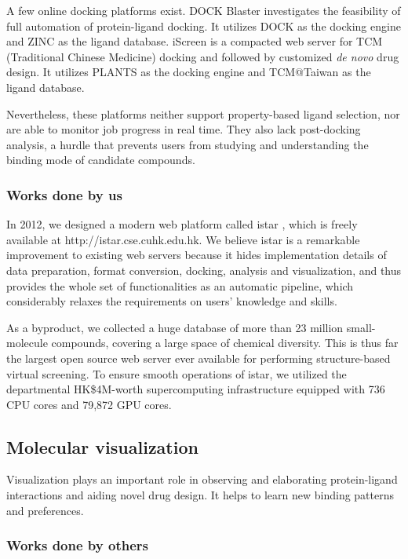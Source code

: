 \documentclass[a4paper,12pt]{article}
\begin{document}
A few online docking platforms exist. DOCK Blaster \citep{557} investigates the feasibility of full automation of protein-ligand docking. It utilizes DOCK \citep{1222} as the docking engine and ZINC \citep{532,1178} as the ligand database. iScreen \citep{899} is a compacted web server for TCM (Traditional Chinese Medicine) docking and followed by customized \textit{de novo} drug design. It utilizes PLANTS \citep{610,607,779} as the docking engine and TCM@Taiwan \citep{528} as the ligand database.

Nevertheless, these platforms neither support property-based ligand selection, nor are able to monitor job progress in real time. They also lack post-docking analysis, a hurdle that prevents users from studying and understanding the binding mode of candidate compounds.

\subsubsection*{Works done by us}

In 2012, we designed a modern web platform called istar \citep{1362}, which is freely available at http://istar.cse.cuhk.edu.hk. We believe istar is a remarkable improvement to existing web servers because it hides implementation details of data preparation, format conversion, docking, analysis and visualization, and thus provides the whole set of functionalities as an automatic pipeline, which considerably relaxes the requirements on users' knowledge and skills.

As a byproduct, we collected a huge database of more than 23 million small-molecule compounds, covering a large space of chemical diversity. This is thus far the largest open source web server ever available for performing structure-based virtual screening. To ensure smooth operations of istar, we utilized the departmental HK\$4M-worth supercomputing infrastructure equipped with 736 CPU cores and 79,872 GPU cores.

\subsection*{Molecular visualization}

Visualization plays an important role in observing and elaborating protein-ligand interactions and aiding novel drug design. It helps to learn new binding patterns and preferences.

\subsubsection*{Works done by others}
\end{document}
